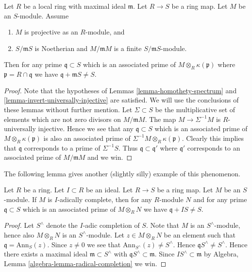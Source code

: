\begin{lemma}
\label{lemma-explain-why-pure}
Let $R$ be a local ring with maximal ideal $\mathfrak m$.
Let $R \to S$ be a ring map. Let $M$ be an $S$-module.
Assume
\begin{enumerate}
\item $M$ is projective as an $R$-module, and
\item $S/\mathfrak mS$ is Noetherian and $M/\mathfrak mM$ is a finite
$S/\mathfrak mS$-module.
\end{enumerate}
Then for any prime $\mathfrak q \subset S$ which is an associated prime of
$M \otimes_R \kappa(\mathfrak p)$ where $\mathfrak p = R \cap \mathfrak q$
we have $\mathfrak q + \mathfrak m S \not = S$.
\end{lemma}

\begin{proof}
Note that the hypotheses of
Lemmas \ref{lemma-homothety-spectrum} and
\ref{lemma-invert-universally-injective}
are satisfied. We will use the conclusions of these lemmas without further
mention. Let $\Sigma \subset S$ be the multiplicative set of elements
which are not zero divisors on $M/\mathfrak mM$. The map
$M \to \Sigma^{-1}M$ is $R$-universally injective. Hence we see that
any $\mathfrak q \subset S$ which is an associated prime of
$M \otimes_R \kappa(\mathfrak p)$ is also an associated prime of
$\Sigma^{-1}M \otimes_R \kappa(\mathfrak p)$. Clearly this implies that
$\mathfrak q$ corresponds to a prime of $\Sigma^{-1}S$.
Thus $\mathfrak q \subset \mathfrak q'$ where $\mathfrak q'$
corresponds to an associated prime of $M/\mathfrak mM$ and we win.
\end{proof}

\noindent
The following lemma gives another (slightly silly) example of this phenomenon.

\begin{lemma}
\label{lemma-explain-why-pure-complete}
Let $R$ be a ring. Let $I \subset R$ be an ideal.
Let $R \to S$ be a ring map. Let $M$ be an $S$-module.
If $M$ is $I$-adically complete, then for any $R$-module $N$ and
for any prime $\mathfrak q \subset S$ which is an associated prime of
$M \otimes_R N$ we have $\mathfrak q + I S \not = S$.
\end{lemma}

\begin{proof}
Let $S^\wedge$ denote the $I$-adic completion of $S$.
Note that $M$ is an $S^\wedge$-module, hence also
$M \otimes_R N$ is an $S^\wedge$-module.
Let $z \in M \otimes_R N$ be an element such that
$\mathfrak q = \text{Ann}_S(z)$. Since $z \not = 0$ we see
that $\text{Ann}_{S^\wedge}(z) \not = S^\wedge$. Hence
$\mathfrak q S^\wedge \not = S^\wedge$. Hence there exists a
maximal ideal $\mathfrak m \subset S^\wedge$ with
$\mathfrak q S^\wedge \subset \mathfrak m$. Since
$IS^\wedge \subset \mathfrak m$ by
Algebra, Lemma \ref{algebra-lemma-radical-completion}
we win.
\end{proof}

